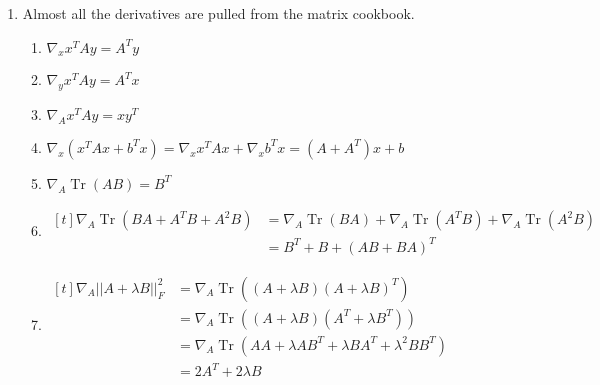 \documentclass[12pt]{article}
\DeclareMathOperator{\Tr}{Tr}
\begin{document}
\begin{enumerate}
            \pagebreak

      \item Almost all the derivatives are pulled from the matrix cookbook.
            \begin{enumerate}
                  \item $\nabla_x x^T A y = A^T y$
                  \item $\nabla_y x^T A y = A^T x$
                  \item $\nabla_A x^T A y = xy^T$
                  \item $\nabla_x \left(x^T A x + b^T x\right)= \nabla_x x^T A x + \nabla_x b^T x = \boxed{\left(A+A^T\right)x+b}$
                  \item $\nabla_A \Tr(AB)=B^T$
                  \item $\begin{aligned}[t]
                                    \nabla_A \Tr\left(BA+A^TB+A^2B\right)
                                     & = \nabla_A \Tr(BA)+\nabla_A \Tr\left(A^TB\right)+\nabla_A \Tr\left(A^2B\right) \\
                                     & = \boxed{B^T + B + (AB+BA)^T}
                              \end{aligned}$
                  \item $\begin{aligned}[t]
                                    \nabla_A ||A+\lambda B||^2_F
                                     & = \nabla_A \Tr\left((A+\lambda B)(A+\lambda B)^T\right)                       \\
                                     & = \nabla_A \Tr\left((A+\lambda B)\left(A^T+\lambda B^T\right)\right)          \\
                                     & = \nabla_A \Tr\left(AA+\lambda A B^T + \lambda B A^T + \lambda^2 B B^T\right) \\
                                     & = \boxed{2A^T+2\lambda B}
                              \end{aligned}$
            \end{enumerate}


\end{enumerate}
\end{document}
